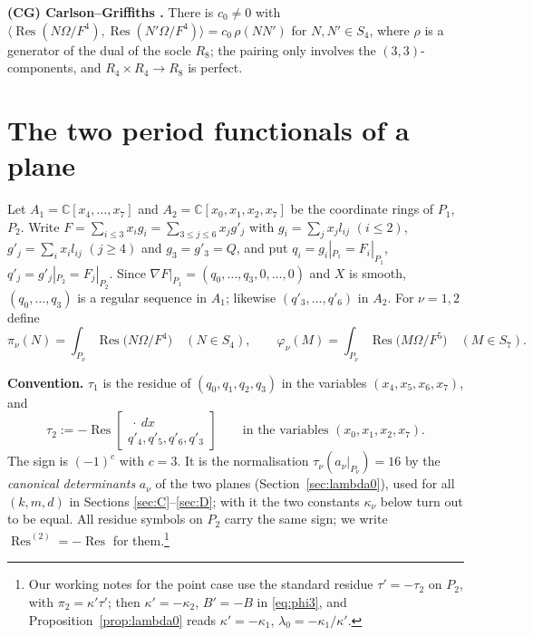 \documentclass[10pt]{article}
\numberwithin{equation}{section}
\theoremstyle{remark}
\newcommand{\CC}{\mathbb{C}}
\newcommand{\Res}{\operatorname{Res}}
\newcommand{\gres}[2]{\Res\!\begin{bmatrix} #1 \\ #2 \end{bmatrix}}
\newcommand{\run}[1]{\medskip\noindent\textbf{#1}}
\begin{document}
\run{(CG) Carlson--Griffiths \cite{CG}.} There is $c_0\neq0$ with
$\langle\Res(N\Omega/F^4),\Res(N'\Omega/F^4)\rangle=c_0\,\rho(NN')$ for $N,N'\in S_4$, where $\rho$ is a
generator of the dual of the socle $R_8$; the pairing only involves the $(3,3)$-components, and
$R_4\times R_4\to R_8$ is perfect.

\section{The two period functionals of a plane}\label{sec:periods}
Let $A_1=\CC[x_4,\dots,x_7]$ and $A_2=\CC[x_0,x_1,x_2,x_7]$ be the coordinate rings of $P_1$, $P_2$. Write
$F=\sum_{i\le3}x_ig_i=\sum_{3\le j\le6}x_jg'_j$ with $g_i=\sum_jx_jl_{ij}$ $(i\le2)$,
$g'_j=\sum_ix_il_{ij}$ $(j\ge4)$ and $g_3=g'_3=Q$, and put $q_i=g_i|_{P_1}=F_i|_{P_1}$,
$q'_j=g'_j|_{P_2}=F_j|_{P_2}$. Since $\nabla F|_{P_1}=(q_0,\dots,q_3,0,\dots,0)$ and $X$ is smooth,
$(q_0,\dots,q_3)$ is a regular sequence in $A_1$; likewise $(q'_3,\dots,q'_6)$ in $A_2$. For $\nu=1,2$ define
\begin{equation}\label{eq:piphi}
\pi_\nu(N)=\int_{P_\nu}\Res\bigl(N\Omega/F^4\bigr)\quad(N\in S_4),\qquad
\varphi_\nu(M)=\int_{P_\nu}\Res\bigl(M\Omega/F^5\bigr)\quad(M\in S_7).
\end{equation}

\run{Convention.} $\tau_1$ is the residue of $(q_0,q_1,q_2,q_3)$ in the variables $(x_4,x_5,x_6,x_7)$, and
\[
\tau_2:=-\gres{\ \cdot\ dx}{q'_4,q'_5,q'_6,q'_3}\qquad\text{in the variables }(x_0,x_1,x_2,x_7).
\]
The sign is $(-1)^c$ with $c=3$. It is the normalisation $\tau_\nu(a_\nu|_{P_\nu})=16$ by the \emph{canonical
determinants} $a_\nu$ of the two planes (Section~\ref{sec:lambda0}), used for all $(k,m,d)$ in Sections
\ref{sec:C}--\ref{sec:D}; with it the two constants $\kappa_\nu$ below turn out to be equal. All residue symbols
on $P_2$ carry the same sign; we write $\Res^{(2)}=-\Res$ for them.\footnote{Our working notes for the point
case use the standard residue $\tau'=-\tau_2$ on $P_2$, with $\pi_2=\kappa'\tau'$; then $\kappa'=-\kappa_2$,
$B'=-B$ in \eqref{eq:phi3}, and Proposition~\ref{prop:lambda0} reads $\kappa'=-\kappa_1$,
$\lambda_0=-\kappa_1/\kappa'$.}
\end{document}
